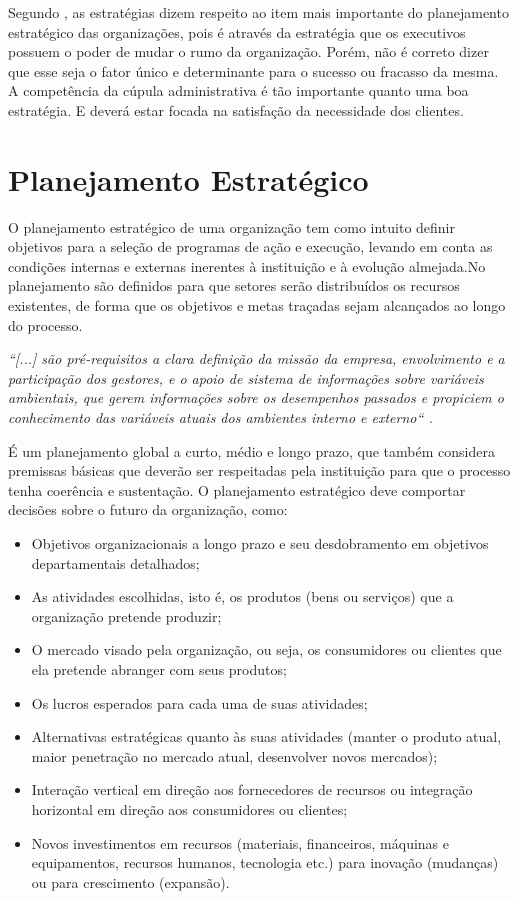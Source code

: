 \documentclass[12pt,a4paper,ruledheader,tocpage=prefix,floatnumber=continuous,pagestart=folhaderosto,font=times]{abnt}
\begin{document}
Segundo , as estratégias dizem respeito ao item mais importante do planejamento estratégico das organizações, pois é através da estratégia
que os executivos possuem o poder de mudar o rumo da organização. Porém, não é correto dizer que esse seja o fator único e determinante para o sucesso ou
fracasso da mesma. A competência da cúpula administrativa é tão importante quanto uma boa estratégia. E deverá estar focada na satisfação da necessidade
dos clientes.

\section{Planejamento Estratégico}
O planejamento estratégico de uma organização tem como intuito definir objetivos para a seleção de programas de ação e execução, levando em conta as 
condições internas e externas inerentes à instituição e à evolução almejada.No planejamento são definidos para que setores serão distribuídos os recursos 
existentes, de forma que os objetivos e metas traçadas sejam alcançados ao longo do processo. 

\begin{flushright}
 \hfill \textit{``[...] são pré-requisitos a clara definição da missão da empresa, envolvimento e a participação dos gestores, e o apoio de sistema de 
informações sobre variáveis ambientais, que gerem informações sobre os desempenhos passados e propiciem o conhecimento das variáveis atuais dos 
ambientes interno e externo`` \cite{CATELLI1999}.}
\end{flushright}

É um planejamento global a curto, médio e longo prazo, que também  considera premissas básicas que deverão ser respeitadas pela instituição para que o 
processo tenha coerência e sustentação. O planejamento estratégico deve comportar decisões sobre o futuro da organização, como:

\begin{itemize}	
\item Objetivos organizacionais a longo prazo e seu desdobramento em objetivos departamentais detalhados; 
\item As atividades escolhidas, isto é, os produtos (bens ou serviços) que a organização pretende produzir;
\item O mercado visado pela organização, ou seja, os consumidores ou clientes que ela pretende abranger com seus produtos;
\item Os lucros esperados para cada uma de suas atividades;
\item Alternativas estratégicas quanto às suas atividades (manter o produto atual, maior penetração no mercado atual, desenvolver novos mercados);
\item Interação vertical em direção aos fornecedores de recursos ou integração horizontal em direção aos consumidores ou clientes;
\item Novos investimentos em recursos (materiais, financeiros, máquinas e equipamentos, recursos humanos, tecnologia etc.) para inovação (mudanças) ou para crescimento (expansão).
\end{itemize}
\end{document}
